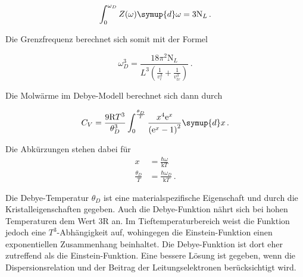 \begin{equation*}
  \int_0^{\omega_D} Z(\omega) \symup{d} \omega = 3 \text{N}_L \, .
  \label{eqn:int}
\end{equation*}

Die Grenzfrequenz berechnet sich somit mit der Formel

\begin{equation}
  \omega_D^3 = \frac{18 \pi^2 \text{N}_L}{L^3 \left(\frac{1}{v_l^3} + \frac{1}{v_{tr}^3} \right)} \, .
  \label{eqn:omega}
\end{equation}

Die Molwärme im Debye-Modell berechnet sich dann durch

\begin{equation}
  C_V = \frac{9 \text{R} T^3}{\theta_D^3} \int_0^{\frac{\theta_D}{T}}
  \frac{x^4 \mathrm{e}^x} {\left(\mathrm{e}^x -1 \right)^2} \symup{d} x \, .
  \label{eqn:debye}
\end{equation}

Die Abkürzungen stehen dabei für
\begin{align*}
  x &= \frac{\hbar \omega}{\text{k} T} \\
  \frac{\theta_D}{T} &= \frac{\hbar \omega_D}{\text{k} T} \, .
\end{align*}

Die Debye-Temperatur $\theta_D$ ist eine materialspezifische Eigenschaft und
durch die Kristalleigenschaften gegeben. Auch die Debye-Funktion nährt sich
bei hohen Temperaturen dem Wert $3 \text{R}$ an. Im Tieftemperaturbereich
weist die Funktion jedoch eine $T^3$-Abhängigkeit auf, wohingegen die
Einstein-Funktion einen exponentiellen Zusammenhang beinhaltet. Die
Debye-Funktion ist dort eher zutreffend als die Einstein-Funktion. Eine bessere
Lösung ist gegeben, wenn die Dispersionsrelation und der Beitrag der
Leitungselektronen berücksichtigt wird.
